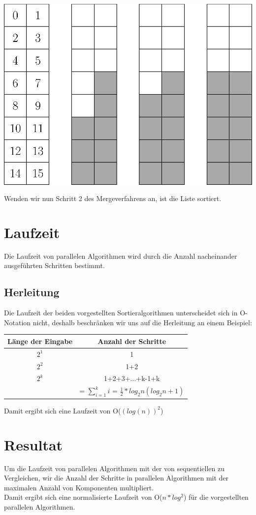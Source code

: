 \documentclass[11pt]{article}
\begin{document}
\begin{description}
\begin{center}
\includegraphics[scale=0.4]{korrektheitOEM.eps}
\end{center}
Wenden wir nun Schritt 2 des Mergeverfahrens an, ist die Liste sortiert.
\end{description}
\section{Laufzeit}
Die Laufzeit von parallelen Algorithmen wird durch die Anzahl nacheinander ausgeführten Schritten bestimmt.
\subsection{Herleitung}
Die Laufzeit der beiden vorgestellten Sortieralgorithmen unterscheidet sich in O-Notation nicht, deshalb beschränken wir uns auf die Herleitung an einem Beispiel:\\
\begin{center}
	\begin{tabular}{c | c}
		Länge der Eingabe & Anzahl der Schritte \\ \hline
		$2^1$ & 1 \\
		$2^2$ & 1+2 \\
		$2^k$ & 1+2+3+...+k-1+k \\
		& = $\sum_{i=1}^ki$ = $\frac{1}{2} * log_2n (log_2n +1) $
	\end{tabular}
\end{center} Damit ergibt sich eine Laufzeit von O($(log(n))^2$)
\section{Resultat}
Um die Laufzeit von parallelen Algorithmen mit der von sequentiellen zu Vergleichen, wir die Anzahl der Schritte in parallelen Algorithmen mit der maximalen Anzahl von Komponenten multipliert.\\
Damit ergibt sich eine normalisierte Laufzeit von O($n*log^2$) für die vorgestellten parallelen Algorithmen.
\end{document}
